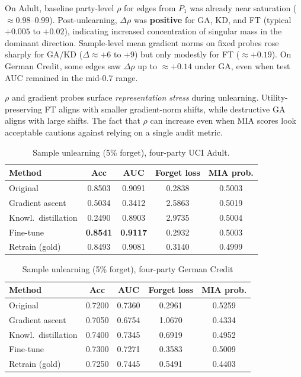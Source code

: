 \documentclass[sigconf,nonacm]{acmart}
\begin{document}
On Adult, baseline party-level $\rho$ for edges from $P_1$ was already near saturation ($\approx$0.98--0.99). Post-unlearning, $\Delta\rho$ was \textbf{positive} for GA, KD, and FT (typical $+0.005$ to $+0.02$), indicating increased concentration of singular mass in the dominant direction. Sample-level mean gradient norms on fixed probes rose sharply for GA/KD ($\Delta \approx +6$ to $+9$) but only modestly for FT ($\approx +0.19$). On German Credit, some edges saw $\Delta\rho$ up to $\approx +0.14$ under GA, even when test AUC remained in the mid-0.7 range.

$\rho$ and gradient probes surface \emph{representation stress} during unlearning. Utility-preserving FT aligns with smaller gradient-norm shifts, while destructive GA aligns with large shifts. The fact that $\rho$ can increase even when MIA scores look acceptable cautions against relying on a single audit metric.
\begin{table}[htbp]
  \caption{Sample unlearning (5\% forget), four-party UCI Adult.}
  \label{tab:adult}
  \small
  \centering
  \begin{tabular}{@{}lcccc@{}}
    \toprule
    Method & Acc & AUC & Forget loss & MIA prob. \\
    \midrule
    Original & 0.8503 & 0.9091 & 0.2838 & 0.5003 \\
    Gradient ascent & 0.5034 & 0.3412 & 2.5863 & 0.5019 \\
    Knowl.\ distillation & 0.2490 & 0.8903 & 2.9735 & 0.5004 \\
    Fine-tune & \textbf{0.8541} & \textbf{0.9117} & 0.2932 & 0.5003 \\
    Retrain (gold) & 0.8493 & 0.9081 & 0.3140 & 0.4999 \\
    \bottomrule
  \end{tabular}
\end{table}

\begin{table}[htbp]
  \caption{Sample unlearning (5\% forget), four-party German Credit}
  \label{tab:german}
  \small
  \centering
  \begin{tabular}{@{}lcccc@{}}
    \toprule
    Method & Acc & AUC & Forget loss & MIA prob. \\
    \midrule
    Original & 0.7200 & 0.7360 & 0.2961 & 0.5259 \\
    Gradient ascent & 0.7050 & 0.6754 & 1.0670 & 0.4334 \\
    Knowl.\ distillation & 0.7400 & 0.7345 & 0.6919 & 0.4952 \\
    Fine-tune & 0.7300 & 0.7271 & 0.3583 & 0.5009 \\
    Retrain (gold) & 0.7250 & 0.7445 & 0.5491 & 0.4403 \\
    \bottomrule
  \end{tabular}
\end{table}
\end{document}
